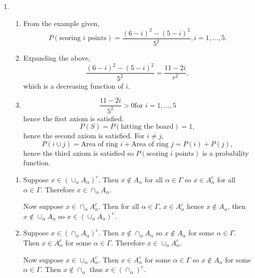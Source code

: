 \documentclass{article}
\begin{document}
\begin{enumerate}
    \item \begin{enumerate}
        \item From the example given, \[
            P(\text{scoring } i \text{ points}) = \frac{(6 - i)^2 - (5 - i)^2}{5^2}, i = 1, ..., 5.
            \]

        \item Expanding the above, 
        \[ \frac{(6 - i)^2 - (5 - i)^2}{5^2} = \frac{11 - 2i}{r^2}, \]
        which is a decreasing function of $i$.

        \item \[
        \frac{11 - 2i}{5^2} > 0 \text{for } i = 1, ..., 5
        \]
        hence the first axiom is satisfied.
        \[ P(S) = P(\text{hitting the board}) = 1, \]
        hence the second axiom is satisfied. For $i \neq j$,
        \[ P(i \cup j) = \text{Area of ring } i + \text{Area of ring } j 
        = P(i) + P(j), \]
        hence the third axiom is satisfied so $P(\text{scoring } i \text{ points})$ 
        is a probability function.
    \end{enumerate}
    
    \begin{enumerate}
        \item Suppose $x \in (\cup_{\alpha} A_{\alpha})^c$. Then $x \notin A_{\alpha}$ for all 
        $\alpha \in \Gamma$ so $x \in A_{\alpha}^{c}$ for all $\alpha \in \Gamma$. Therefore 
        $x \in \cap_{\alpha} A_{\alpha}$.

        Now suppose $x \in \cap_{\alpha} A_{\alpha}^{c}$. Then for all $\alpha \in \Gamma$, 
        $x \in A_{\alpha}^{c}$ hence $x \notin A_{\alpha}$, then 
        $x \notin \cup_{\alpha} A_{\alpha}$ so $x \in (\cup_{\alpha} A_{\alpha})^{c}$.

        \item Suppose $x \in (\cap_{\alpha} A_{\alpha})^{c}$. Then 
        $x \notin \cap_{\alpha} A_{\alpha}$ so $x \notin A_{\alpha}$ for some 
        $\alpha \in \Gamma$. Then $x \in A_{\alpha}^{c}$ for some $\alpha \in \Gamma$. 
        Therefore $x \in \cup_{\alpha} A_{\alpha}^{c}$.

        Now suppose $x \in \cup_{\alpha} A_{\alpha}^{c}$. Then $x \in A_{\alpha}^{c}$ for some 
        $\alpha \in \Gamma$ so $x \notin A_{\alpha}$ for some $\alpha \in \Gamma$. Then 
        $x \notin \cap_{\alpha}$ thus $x \in (\cap_{\alpha})^{c}$.
    \end{enumerate}

\end{enumerate}
\end{document}
